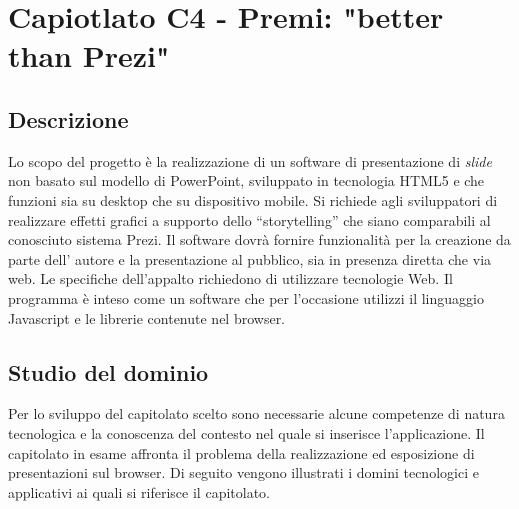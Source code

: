 \section{Capiotlato C4 - Premi: "better than Prezi"}
\subsection{Descrizione}
Lo scopo del progetto è la realizzazione di un software di presentazione di \textit{slide} non basato sul modello di PowerPoint, sviluppato in tecnologia HTML5 e che funzioni sia su desktop che su dispositivo mobile. Si richiede agli sviluppatori di realizzare effetti grafici a supporto dello
“storytelling” che siano comparabili al conosciuto sistema Prezi. Il software dovrà fornire funzionalità per la creazione da parte dell' autore e la presentazione al pubblico, sia in presenza diretta che via web. Le specifiche dell'appalto richiedono di utilizzare tecnologie Web. Il programma è inteso come un software che per l'occasione utilizzi il linguaggio Javascript e le librerie contenute
nel browser.

\subsection{Studio del dominio}
Per lo sviluppo del capitolato scelto sono necessarie alcune competenze di natura tecnologica e la conoscenza del contesto nel quale si inserisce l’applicazione. Il capitolato in esame affronta il problema della realizzazione ed esposizione di presentazioni sul browser. Di seguito vengono illustrati i domini tecnologici e applicativi ai quali si riferisce il capitolato.

